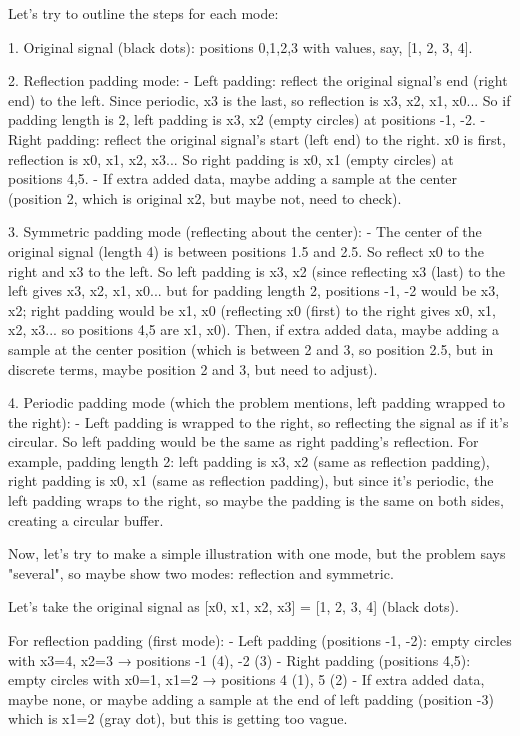 Let's try to outline the steps for each mode:

1. Original signal (black dots): positions 0,1,2,3 with values, say, [1, 2, 3, 4].

2. Reflection padding mode:
   - Left padding: reflect the original signal's end (right end) to the left. Since periodic, x3 is the last, so reflection is x3, x2, x1, x0... So if padding length is 2, left padding is x3, x2 (empty circles) at positions -1, -2.
   - Right padding: reflect the original signal's start (left end) to the right. x0 is first, reflection is x0, x1, x2, x3... So right padding is x0, x1 (empty circles) at positions 4,5.
   - If extra added data, maybe adding a sample at the center (position 2, which is original x2, but maybe not, need to check).

3. Symmetric padding mode (reflecting about the center):
   - The center of the original signal (length 4) is between positions 1.5 and 2.5. So reflect x0 to the right and x3 to the left. So left padding is x3, x2 (since reflecting x3 (last) to the left gives x3, x2, x1, x0... but for padding length 2, positions -1, -2 would be x3, x2; right padding would be x1, x0 (reflecting x0 (first) to the right gives x0, x1, x2, x3... so positions 4,5 are x1, x0). Then, if extra added data, maybe adding a sample at the center position (which is between 2 and 3, so position 2.5, but in discrete terms, maybe position 2 and 3, but need to adjust).

4. Periodic padding mode (which the problem mentions, left padding wrapped to the right):
   - Left padding is wrapped to the right, so reflecting the signal as if it's circular. So left padding would be the same as right padding's reflection. For example, padding length 2: left padding is x3, x2 (same as reflection padding), right padding is x0, x1 (same as reflection padding), but since it's periodic, the left padding wraps to the right, so maybe the padding is the same on both sides, creating a circular buffer.

Now, let's try to make a simple illustration with one mode, but the problem says "several", so maybe show two modes: reflection and symmetric.

Let's take the original signal as [x0, x1, x2, x3] = [1, 2, 3, 4] (black dots).

For reflection padding (first mode):
- Left padding (positions -1, -2): empty circles with x3=4, x2=3 → positions -1 (4), -2 (3)
- Right padding (positions 4,5): empty circles with x0=1, x1=2 → positions 4 (1), 5 (2)
- If extra added data, maybe none, or maybe adding a sample at the end of left padding (position -3) which is x1=2 (gray dot), but this is getting too vague.


